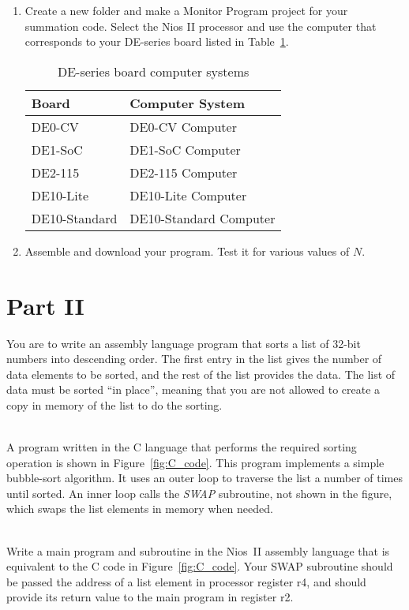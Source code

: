 \documentclass[epsfig,10pt,fullpage]{article}
\begin{document}
\begin{enumerate}
\item
Create a new folder and make a Monitor Program project for your summation code. Select
the Nios II processor and use the computer that corresponds to your DE-series board listed in Table~\ref{tab:computer_systems}. 

\begin{table}[H]
	\begin{center}
	\begin{tabular}{ l | l }
	\bf{Board} & \bf{Computer System} \\
	\hline
	\rule{0pt}{3ex}DE0-CV & DE0-CV Computer \\ 
	DE1-SoC & DE1-SoC Computer \\
	DE2-115 & DE2-115 Computer \\
	DE10-Lite & DE10-Lite Computer \\
	DE10-Standard & DE10-Standard Computer \\
	\end{tabular}
	\caption{DE-series board computer systems}
	\label{tab:computer_systems}
	\end{center}
\end{table}

\item
Assemble and download your program.  Test it for various values of $N$.
\end{enumerate}

\section*{Part II}
You are to write an assembly language program that sorts a list of 32-bit numbers 
into descending order.  The first entry in the list gives the number of data elements to 
be sorted, and the rest of the list provides the data. The list of data must be 
sorted ``in place'', meaning that you are not allowed to create a copy in memory of the 
list to do the sorting.  

~\\
A program written in the C language that performs the required sorting operation is shown in
Figure~\ref{fig:C_code}. This program implements a simple bubble-sort algorithm. It uses
an outer loop to traverse the list a number of times until sorted. An inner loop 
calls the {\it SWAP} subroutine, not shown in the figure, which swaps the list elements in
memory when needed.

~\\
Write a main program and subroutine in the Nios~II assembly language that is equivalent to 
the C code in Figure~\ref{fig:C_code}.
Your SWAP subroutine should be passed the address of a list element in processor register r4, 
and should provide its return value to the main program in register r2. 
\end{document}
